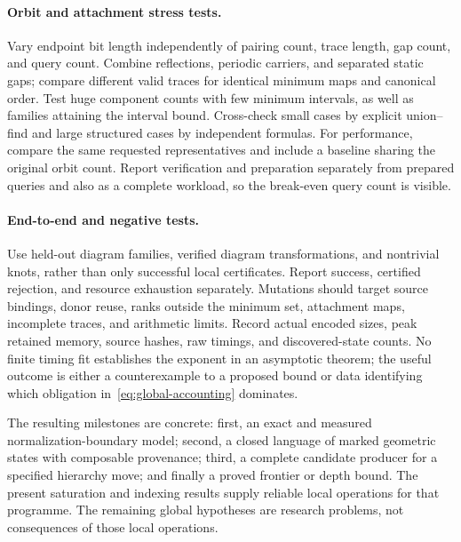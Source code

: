 \paragraph{Orbit and attachment stress tests.}
Vary endpoint bit length independently of pairing count, trace length,
gap count, and query count. Combine reflections, periodic carriers, and
separated static gaps; compare different valid traces for identical
minimum maps and canonical order. Test huge component counts with few
minimum intervals, as well as families attaining the interval bound.
Cross-check small cases by explicit union--find and large structured cases
by independent formulas. For performance, compare the same requested
representatives and include a baseline sharing the original orbit count.
Report verification and preparation separately from prepared queries and
also as a complete workload, so the break-even query count is visible.

\paragraph{End-to-end and negative tests.}
Use held-out diagram families, verified diagram transformations, and
nontrivial knots, rather than only successful local certificates. Report
success, certified rejection, and resource exhaustion separately.
Mutations should target source bindings, donor reuse, ranks outside the
minimum set, attachment maps, incomplete traces, and arithmetic limits.
Record actual encoded sizes, peak retained memory, source hashes, raw
timings, and discovered-state counts. No finite timing fit establishes
the exponent in an asymptotic theorem; the useful outcome is either a
counterexample to a proposed bound or data identifying which obligation
in~\eqref{eq:global-accounting} dominates.

The resulting milestones are concrete: first, an exact and measured
normalization-boundary model; second, a closed language of marked
geometric states with composable provenance; third, a complete candidate
producer for a specified hierarchy move; and finally a proved frontier or
depth bound. The present saturation and indexing results supply reliable
local operations for that programme. The remaining global hypotheses are
research problems, not consequences of those local operations.
